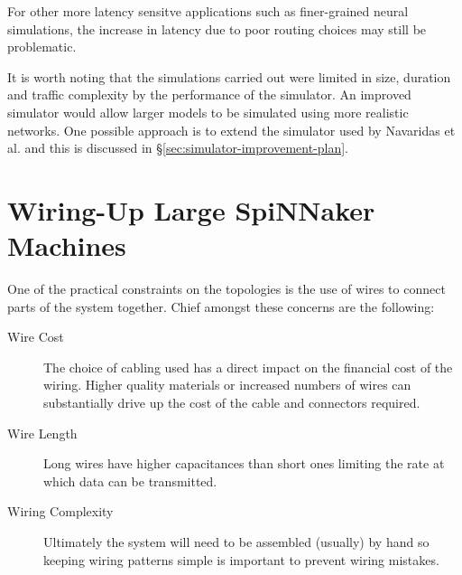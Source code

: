 			For other more latency sensitve applications such as finer-grained neural
			simulations, the increase in latency due to poor routing choices may still
			be problematic.
			
			It is worth noting that the simulations carried out were limited in size,
			duration and traffic complexity by the performance of the simulator. An
			improved simulator would allow larger models to be simulated using more
			realistic networks. One possible approach is to extend the simulator used
			by Navaridas et al. and this is discussed in \S\ref{sec:simulator-improvement-plan}.
		
	
	\section{Wiring-Up Large SpiNNaker Machines}
		
		\label{sec:wiring-up-large-spinnaker-machines}
		
		
		One of the practical constraints on the topologies is the use of wires to
		connect parts of the system together.  Chief amongst these concerns are the
		following:
		
		\begin{description}
			
			\item[Wire Cost] The choice of cabling used has a direct impact on the
			financial cost of the wiring. Higher quality materials or increased
			numbers of wires can substantially drive up the cost of the cable and
			connectors required.
			
			\item[Wire Length] Long wires have higher capacitances than short ones
			limiting the rate at which data can be transmitted.
			
			\item[Wiring Complexity] Ultimately the system will need to be assembled
			(usually) by hand so keeping wiring patterns simple is important to
			prevent wiring mistakes.
			
		\end{description}
		
